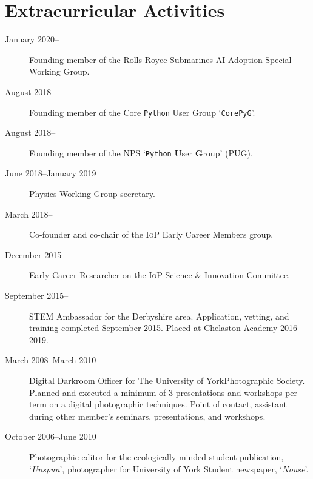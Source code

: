 \documentclass[margin,line]{resume}
\begin{document}
\begin{resume}
\begin{description}
	\end{description}

	\section{\mysidestyle Extracurricular Activities}\vspace{1mm}

	\begin{description}

		\item[January 2020--] Founding member of the Rolls-Royce Submarines
		      AI Adoption Special Working Group.

		\item[August 2018--] Founding member of the Core \texttt{Python} User Group
		      `\texttt{CorePyG}'.

		\item[August 2018--] Founding member of the NPS `\texttt{\textbf{P}ython}
		      \textbf{U}ser \textbf{G}roup' (PUG).

		\item[June 2018--January 2019] Physics Working Group secretary.

		\item[March 2018--] Co-founder and co-chair of the \textsc{IoP} Early
		      Career Members group.

		\item[December 2015--] Early Career Researcher on the \textsc{IoP} Science
		      \& Innovation Committee.

		\item[September 2015--] STEM Ambassador for the Derbyshire area. Application,
		      vetting, and training completed September 2015. Placed at Chelaston
		      Academy 2016--2019.

		\item[March 2008--March 2010] Digital Darkroom Officer for The University of
		      York\linebreak Photographic Society. Planned and executed a minimum
		      of 3 presentations and workshops per term on a digital photographic
		      techniques.  Point of contact, assistant during other member's
		      seminars, presentations, and workshops.

		\item[October 2006--June 2010] Photographic editor for the
		      ecologically-minded student publication, `\textit{Unspun}',
		      photographer for University of York Student newspaper,
		      `\textit{Nouse}'.


\end{description}
\end{resume}
\end{document}
